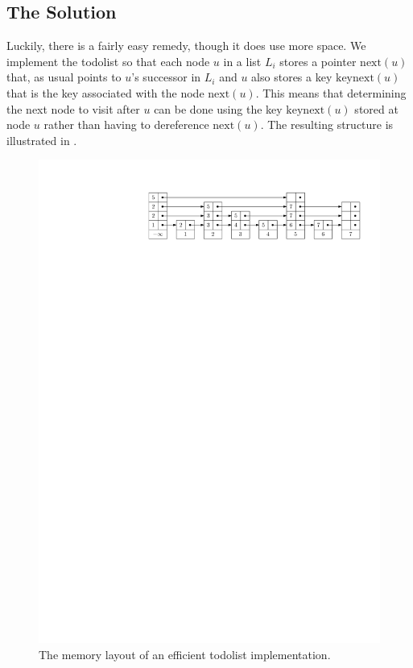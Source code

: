 \documentclass[lotsofwhite]{patmorin}
\begin{document}
\subsection{The Solution}

Luckily, there is a fairly easy remedy, though it does use more space.
We implement the todolist so that each node $u$ in a list $L_i$ stores
a pointer $\mathrm{next}(u)$ that, as usual points to $u$'s successor
in $L_i$ and $u$ also stores a key $\mathrm{keynext}(u)$ that is the
key associated with the node $\mathrm{next}(u)$.  This means that
determining the next node to visit after $u$ can be done using the
key $\mathrm{keynext}(u)$ stored at node $u$ rather than having to
dereference $\mathrm{next}(u)$. The resulting structure is illustrated in
.

\begin{figure}
   \centerline{\includegraphics{packed-in}}
   \caption{The memory layout of an efficient todolist implementation.}
\end{figure}
\end{document}
